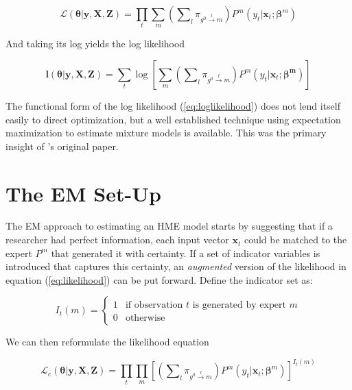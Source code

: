 \documentclass[12pt]{article}
\newcommand{\sumgateprod}[3]{\pi_{#1 \overset{#3}{\longrightarrow} #2}}
\newcommand{\shortsum}[1]{\sum \nolimits_{#1}}
\begin{document}
\begin{equation} \label{eq:likelihood}
  \mathcal{L}(\boldsymbol{\theta}| \boldsymbol{y}, \boldsymbol{X}, \boldsymbol{Z}) = \prod_{t}  \sum_{m} \left( \shortsum{l} \sumgateprod{g^{0}}{m}{l} \right)  P^{m}(y_{t}| \boldsymbol{x}_{t}; \boldsymbol{\beta}^{m})
\end{equation}

And taking its log yields the log likelihood

\begin{equation} \label{eq:loglikelihood}
  \boldsymbol{l}(\boldsymbol{\theta}| \boldsymbol{y}, \boldsymbol{X}, \boldsymbol{Z}) = \sum_{t} \log \left[ \sum_{m} \left( \shortsum{l} \sumgateprod{g^{0}}{m}{l} \right) P^{m}(y_{t}| \boldsymbol{x}_{t}; \boldsymbol{\beta^{m}}) \right]
\end{equation}

The functional form of the log likelihood (\ref{eq:loglikelihood}) does not
lend itself easily to direct optimization, but a well established
technique using expectation maximization \citep{EM_DLR1977} to estimate mixture
models is available. This was the primary insight of \citet{JordanJacobs1993}'s
original paper.


\section{The EM Set-Up} \label{sec:Estimation}

The EM approach to estimating an HME model starts by suggesting that if a
researcher had perfect information, each input vector $\boldsymbol{x}_{t}$ could be matched
to the expert $P^{m}$ that generated it with certainty. If a set of indicator
variables is introduced that captures this certainty, an \textit{augmented}
version of the likelihood in equation (\ref{eq:likelihood}) can be put forward.
Define the indicator set as:

\begin{equation} \label{eq:indicator}
  I_{t}(m) = \begin{cases} 
     1 & \textrm{if observation $t$ is generated by expert $m$} \\
     0 & \textrm{otherwise}
             \end{cases}
\end{equation}

We can then reformulate the likelihood equation

\begin{equation}  \label{eq:auglikelihood}
  \mathcal{L}_{c}(\boldsymbol{\theta}| \boldsymbol{y}, \boldsymbol{X}, \boldsymbol{Z}) = \prod_{t} \prod_{m} \left[ \left( \shortsum{l} \sumgateprod{g^{0}}{m}{l} \right)  P^{m}(y_{t}| \boldsymbol{x}_{t}; \boldsymbol{\beta}^{m}) \right]^{I_{t}(m)}
\end{equation}
\end{document}
